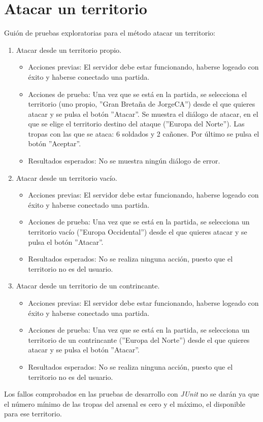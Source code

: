\section{Atacar un territorio}

Guión de pruebas exploratorias para el método atacar un territorio:

\begin{enumerate}
\item Atacar desde un territorio propio.
	\begin{itemize}
	\item Acciones previas: El servidor debe estar funcionando, haberse logeado con éxito y haberse conectado una partida.
	\item Acciones de prueba: Una vez que se está en la partida, se selecciona el territorio (uno propio, ''Gran Bretaña de JorgeCA'') desde el que quieres atacar y se pulsa el botón ''Atacar''. Se muestra el diálogo de atacar, en el que se elige el territorio destino del ataque (''Europa del Norte''). Las tropas con las que se ataca: 6 soldados y 2 cañones. Por último se pulsa el botón ''Aceptar''.
	\item Resultados esperados: No se muestra ningún diálogo de error.
	\end{itemize}
\item Atacar desde un territorio vacío.
	\begin{itemize}
	\item Acciones previas: El servidor debe estar funcionando, haberse logeado con éxito y haberse conectado una partida.
	\item Acciones de prueba: Una vez que se está en la partida, se selecciona un territorio vacío (''Europa Occidental'') desde el que quieres atacar y se pulsa el botón ''Atacar''. 
	\item Resultados esperados: No se realiza ninguna acción, puesto que el territorio no es del usuario.
	\end{itemize}
\item Atacar desde un territorio de un contrincante.
	\begin{itemize}
	\item Acciones previas: El servidor debe estar funcionando, haberse logeado con éxito y haberse conectado una partida.
	\item Acciones de prueba: Una vez que se está en la partida, se selecciona un territorio de un contrincante (''Europa del Norte'') desde el que quieres atacar y se pulsa el botón ''Atacar''. 
	\item Resultados esperados: No se realiza ninguna acción, puesto que el territorio no es del usuario.
	\end{itemize}
\end{enumerate}

Los fallos comprobados en las pruebas de desarrollo con \textit{JUnit} no se darán ya que el número mínimo de las tropas del arsenal es cero y el máximo, el disponible para ese territorio.
